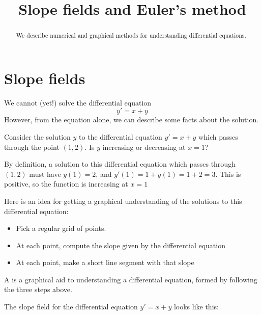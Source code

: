\documentclass{ximera}
\title[Dig-In:]{Slope fields and Euler's method}
\begin{document}
\begin{abstract}
We describe numerical and graphical methods for understanding
differential equations.
\end{abstract}
\maketitle


\section{Slope fields}

We cannot (yet!) solve the differential equation
\[
y' = x+y
\]
However, from the equation alone, we can describe some facts about the
solution.

\begin{question}
  Consider the solution $y$ to the differential equation $y'=x+y$
  which passes through the point $(1,2)$.  Is $y$ increasing or
  decreasing at $x=1$?
  \begin{multipleChoice}
  \end{multipleChoice}
  \begin{hint}
    By definition, a solution to this differential equation which
    passes through $(1,2)$ must have $y(1)=2$, and $y'(1) = 1+y(1) =
    1+2=3$.  This is positive, so the function is increasing at $x=1$
  \end{hint}
\end{question}

Here is an idea for getting a graphical understanding of the solutions
to this differential equation:

\begin{itemize}
	\item Pick a regular grid of points.
	\item At each point, compute the slope given by the differential equation
	\item At each point, make a short line segment with that slope
\end{itemize}

\begin{definition}
	A  is a graphical aid to understanding a differential equation, formed by following the three steps above.
\end{definition}

The slope field for the differential equation $y' = x+y$ looks like this:
\end{document}
